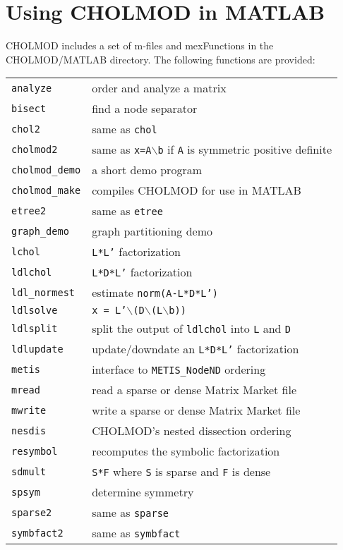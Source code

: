 \documentclass[11pt]{article}
\begin{document}
\newpage \section{Using CHOLMOD in MATLAB}

CHOLMOD includes a set of m-files and mexFunctions in the CHOLMOD/MATLAB
directory.  The following functions are provided:

\vspace{0.1in}
\begin{tabular}{ll}
\hline
{\tt analyze}	    & order and analyze a matrix \\
{\tt bisect}	    & find a node separator \\
{\tt chol2}	    & same as {\tt chol} \\
{\tt cholmod2}	    & same as {\tt x=A}$\backslash${\tt b} if {\tt A} is symmetric positive definite \\
{\tt cholmod\_demo} & a short demo program \\
{\tt cholmod\_make} & compiles CHOLMOD for use in MATLAB \\
{\tt etree2}	    & same as {\tt etree} \\
{\tt graph\_demo}   & graph partitioning demo \\
{\tt lchol}	    & {\tt L*L'} factorization \\
{\tt ldlchol}	    & {\tt L*D*L'} factorization \\
{\tt ldl\_normest}  & estimate {\tt norm(A-L*D*L')} \\
{\tt ldlsolve}	    & {\tt x = L'}$\backslash${\tt (D}$\backslash${\tt (L}$\backslash${\tt b))} \\
{\tt ldlsplit}	    & split the output of {\tt ldlchol} into {\tt L} and {\tt D} \\
{\tt ldlupdate}	    & update/downdate an {\tt L*D*L'} factorization \\
{\tt metis}	    & interface to {\tt METIS\_NodeND} ordering \\
{\tt mread}	    & read a sparse or dense Matrix Market file \\
{\tt mwrite}	    & write a sparse or dense Matrix Market file \\
{\tt nesdis}	    & CHOLMOD's nested dissection ordering \\
{\tt resymbol}	    & recomputes the symbolic factorization \\
{\tt sdmult}	    & {\tt S*F} where {\tt S} is sparse and {\tt F} is dense \\
{\tt spsym}	    & determine symmetry \\
{\tt sparse2}	    & same as {\tt sparse} \\
{\tt symbfact2}	    & same as {\tt symbfact} \\
\hline
\end{tabular}
\end{document}
